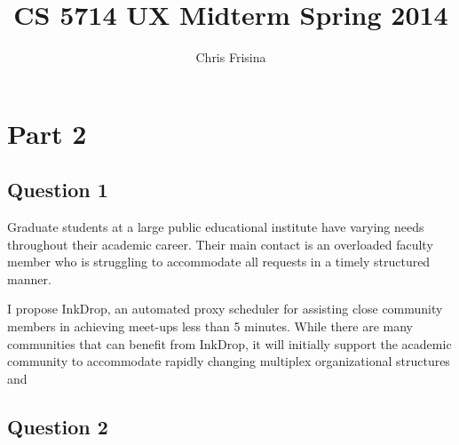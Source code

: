 \documentclass[11pt]{article}
\begin{document}
\title{CS 5714 UX Midterm Spring 2014}
\author{Chris Frisina}

\section*{Part 2} %
  \subsection{Question 1} 


  Graduate students at a large public educational institute have varying needs throughout their academic career.
  Their main contact is an overloaded faculty member who is struggling to accommodate all requests in a timely structured manner.

  I propose InkDrop, an automated proxy scheduler for assisting close community members in achieving meet-ups less than 5 minutes.
  While there are many communities that can benefit from InkDrop, it will initially support the academic community to accommodate rapidly changing multiplex organizational structures and  

  \subsection{Question 2}
\end{document}

